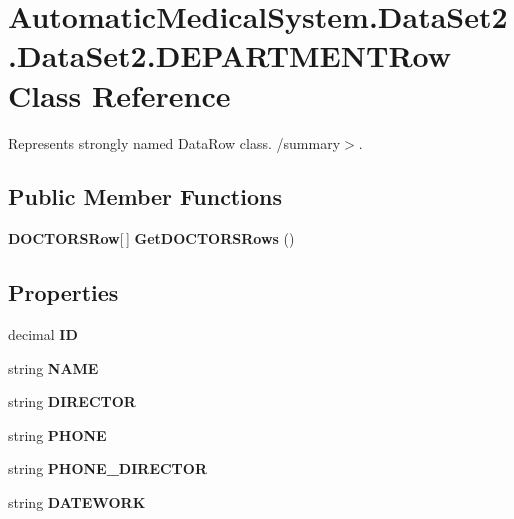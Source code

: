 \section{AutomaticMedicalSystem.DataSet2.DataSet2.DEPARTMENTRow Class Reference}
\label{class_automatic_medical_system_1_1_data_set2_1_1_d_e_p_a_r_t_m_e_n_t_row}
Represents strongly named DataRow class. /summary$>$.  


\subsection*{Public Member Functions}
\begin{CompactItemize}
\item 
{\bf DOCTORSRow}[$\,$] \textbf{GetDOCTORSRows} ()\label{class_automatic_medical_system_1_1_data_set2_1_1_d_e_p_a_r_t_m_e_n_t_row_95b0a3af7cee23a7ffac385ff4932947}

\end{CompactItemize}
\subsection*{Properties}
\begin{CompactItemize}
\item 
decimal \textbf{ID}\hspace{0.3cm}{\tt  [get, set]}\label{class_automatic_medical_system_1_1_data_set2_1_1_d_e_p_a_r_t_m_e_n_t_row_de749b6b7fd19a3e8ec43ce560b7dbfd}

\item 
string \textbf{NAME}\hspace{0.3cm}{\tt  [get, set]}\label{class_automatic_medical_system_1_1_data_set2_1_1_d_e_p_a_r_t_m_e_n_t_row_2212ba29b6c83a9f47a21a4e8eab502d}

\item 
string \textbf{DIRECTOR}\hspace{0.3cm}{\tt  [get, set]}\label{class_automatic_medical_system_1_1_data_set2_1_1_d_e_p_a_r_t_m_e_n_t_row_0ea232e2419cca40859f9af00256d952}

\item 
string \textbf{PHONE}\hspace{0.3cm}{\tt  [get, set]}\label{class_automatic_medical_system_1_1_data_set2_1_1_d_e_p_a_r_t_m_e_n_t_row_54bb9cb8ea0935ac18f64be6efaa7418}

\item 
string \textbf{PHONE\_\-DIRECTOR}\hspace{0.3cm}{\tt  [get, set]}\label{class_automatic_medical_system_1_1_data_set2_1_1_d_e_p_a_r_t_m_e_n_t_row_4f199403d86c5143f4de34729d17f012}

\item 
string \textbf{DATEWORK}\hspace{0.3cm}{\tt  [get, set]}\label{class_automatic_medical_system_1_1_data_set2_1_1_d_e_p_a_r_t_m_e_n_t_row_91df088f69660669b687bcbdf4402c39}

\end{CompactItemize}


